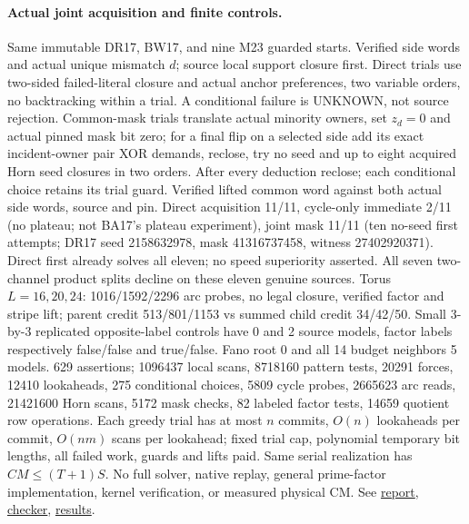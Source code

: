 \documentclass[11pt]{article}
\begin{document}
\paragraph{Actual joint acquisition and finite controls.}
Same immutable DR17, BW17, and nine M23 guarded starts. Verified side words and actual unique mismatch \(d\); source local support closure first. Direct trials use two-sided failed-literal closure and actual anchor preferences, two variable orders, no backtracking within a trial. A conditional failure is UNKNOWN, not source rejection. Common-mask trials translate actual minority owners, set \(z_d=0\) and actual pinned mask bit zero; for a final flip on a selected side add its exact incident-owner pair XOR demands, reclose, try no seed and up to eight acquired Horn seed closures in two orders. After every deduction reclose; each conditional choice retains its trial guard. Verified lifted common word against both actual side words, source and pin. Direct acquisition 11/11, cycle-only immediate 2/11 (no plateau; not BA17's plateau experiment), joint mask 11/11 (ten no-seed first attempts; DR17 seed 2158632978, mask 41316737458, witness 27402920371). Direct first already solves all eleven; no speed superiority asserted. All seven two-channel product splits decline on these eleven genuine sources. Torus \(L=16,20,24\): 1016/1592/2296 arc probes, no legal closure, verified factor and stripe lift; parent credit 513/801/1153 vs summed child credit 34/42/50. Small 3-by-3 replicated opposite-label controls have 0 and 2 source models, factor labels respectively false/false and true/false. Fano root 0 and all 14 budget neighbors 5 models. 629 assertions; 1096437 local scans, 8718160 pattern tests, 20291 forces, 12410 lookaheads, 275 conditional choices, 5809 cycle probes, 2665623 arc reads, 21421600 Horn scans, 5172 mask checks, 82 labeled factor tests, 14659 quotient row operations. Each greedy trial has at most \(n\) commits, \(O(n)\) lookaheads per commit, \(O(nm)\) scans per lookahead; fixed trial cap, polynomial temporary bit lengths, all failed work, guards and lifts paid. Same serial realization has \(CM\le(T+1)S\). No full solver, native replay, general prime-factor implementation, kernel verification, or measured physical CM. See \href{https://github.com/j15marti/pnp/commit/faf1bd79bb94f49ae668215955c86c5b69e26357}{report}, \href{https://github.com/j15marti/pnp/commit/ccf807f50b02f535457a57fae2e4d6a0503e4310}{checker}, \href{https://github.com/j15marti/pnp/commit/bfdecea6b3212cce8b13b4acdd55b3326ca3272c}{results}.
\end{document}
